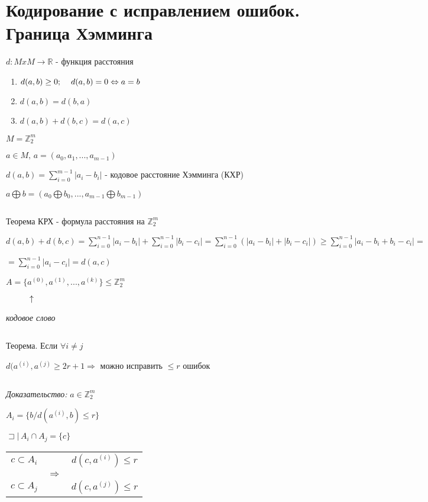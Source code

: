 \documentclass[12pt]{article}
\begin{document}
\section{Кодирование с исправлением ошибок. Граница Хэмминга}
$d:MxM \rightarrow \mathbb{R}$ - функция расстояния
\begin{enumerate}
    \item $d(a,b) \geq 0; \hspace{4 mm} d(a,b) = 0 \Leftrightarrow a = b$
    \item $d(a,b) = d(b,a)$
    \item $d(a,b) + d(b,c) = d(a,c)$
\end{enumerate}\par
    $M = \mathbb{Z}_2^m$\par
    $a \in M, \,a = (a_0, a_1, ..., a_{m-1})$\par
    $d(a,b) = \sum\limits_{i=0}^{m-1} |a_i - b_i|$ - кодовое расстояние Хэмминга (КХР)\par
    $a \bigoplus b = (a_0 \bigoplus b_0, ... , a_{m-1} \bigoplus b_{m-1})$\par
    $ $\par
    Теорема КРХ - формула расстояния на $\mathbb{Z}_2^m$\par
    $d(a,b)+d(b,c) = \sum\limits_{i=0}^{n-1}|a_i - b_i|+\sum\limits_{i=0}^{n-1}|b_i - c_i|=\sum\limits_{i=0}^{n-1}(|a_i - b_i|+|b_i - c_i|) \geq \sum\limits_{i=0}^{n-1}|a_i - b_i + b_i - c_i| =$\par
    $ =\sum\limits_{i=0}^{n-1}|a_i - c_i| = d(a,c)$\par
    $A=\{a^{(0)}, a^{(1)}, ... , a^{(k)}\} \leq \mathbb{Z}_2^m$\par
    $\hspace{1 cm} \uparrow$\par
    \textit{кодовое слово}\par
    $ $\par
    Теорема. Если $\forall i \neq j$\par
    $d(a^{(i)},a^{(j)} \geq 2r+1 \Rightarrow$ можно исправить $\leq r$ ошибок \par
    $ $\par
    \textit{Доказательство:} $a \in \mathbb{Z}_2^m$\par
    $A_i = \{ b / d(a^{(i)}, b) \leq r \}$\par
    $\sqsupset | \, A_i \cap A_j = \{ c \}$\par
    \begin{tabular}{c|cc}
        $c \subset A_i$ & & $d(c,a^{(i)}) \leq r$ \\
         & $\Rightarrow$ \\
        $c \subset A_j$ & & $d(c,a^{(j)}) \leq r$ \\
    \end{tabular}\par
\end{document}
